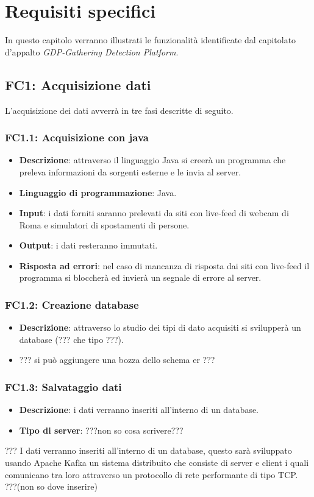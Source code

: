 \chapter{Requisiti specifici}
In questo capitolo verranno illustrati le funzionalità identificate dal capitolato d'appalto \textit{GDP-Gathering Detection Platform}. 
\section{FC1: Acquisizione dati}
L'acquisizione dei dati avverrà in tre fasi descritte di seguito.
\subsection{FC1.1: Acquisizione con java}
\begin{itemize}
	\item \textbf{Descrizione}: attraverso il linguaggio Java si creerà un programma che preleva informazioni da sorgenti esterne e le invia al server.
	\item \textbf{Linguaggio di programmazione}: Java.
	\item \textbf{Input}: i dati forniti saranno prelevati da siti con live-feed di webcam di Roma e simulatori di spostamenti di persone.
	\item \textbf{Output}: i dati resteranno immutati.
	\item \textbf{Risposta ad errori}: nel caso di mancanza di risposta dai siti con live-feed il programma si bloccherà ed invierà un segnale di errore al server.
\end{itemize}
\subsection{FC1.2: Creazione database}
\begin{itemize}
	\item \textbf{Descrizione}: attraverso lo studio dei tipi di dato acquisiti si svilupperà un database (??? che tipo ???).
	\item ??? si può aggiungere una bozza dello schema er ???
\end{itemize}
\subsection{FC1.3: Salvataggio dati}
\begin{itemize}
	\item \textbf{Descrizione}: i dati verranno inseriti all'interno di un database.
	\item \textbf{Tipo di server}: ???non so cosa scrivere???
\end{itemize}
??? I dati verranno inseriti all'interno di un database, questo sarà sviluppato usando Apache Kafka un sistema distribuito che consiste di server e client i quali comunicano tra loro attraverso un protocollo di rete performante di tipo TCP. ???(non so dove inserire)

